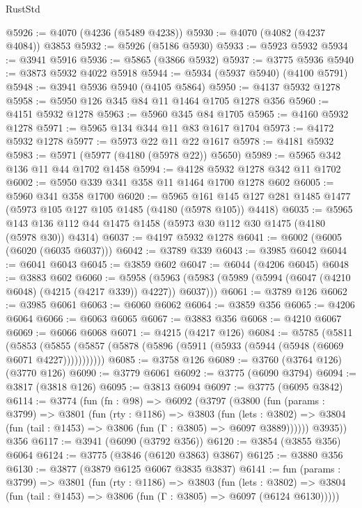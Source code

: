 \begin{lexlean}{RustStd}
\begin{coremodule}
{\begin{coremodule}
{{{{{{{{{{{{{{{{{{{{{{{{{{{{{{{@5926 := @4070 (@4236 (@5489 @4238))
@5930 := @4070 (@4082 (@4237 @4084)) @3853
@5932 := @5926 (@5186 @5930)
@5933 := @5923 @5932
@5934 := @3941 @5916
@5936 := @5865 (@3866 @5932)
@5937 := @3775 @5936
@5940 := @3873 @5932 @4022 @5918
@5944 := @5934 (@5937 @5940) (@4100 @5791)
@5948 := @3941 @5936 @5940 (@4105 @5864)
@5950 := @4137 @5932 @1278
@5958 := @5950 @126 @345 @84 @11 @1464 @1705 @1278 @356
@5960 := @4151 @5932 @1278
@5963 := @5960 @345 @84 @1705
@5965 := @4160 @5932 @1278
@5971 := @5965 @134 @344 @11 @83 @1617 @1704
@5973 := @4172 @5932 @1278
@5977 := @5973 @22 @11 @22 @1617
@5978 := @4181 @5932
@5983 := @5971 (@5977 (@4180 (@5978 @22)) @5650)
@5989 := @5965 @342 @136 @11 @44 @1702 @1458
@5994 := @4128 @5932 @1278 @342 @11 @1702
@6002 := @5950 @339 @341 @358 @11 @1464 @1700 @1278 @602
@6005 := @5960 @341 @358 @1700
@6020 := @5965
    @161
    @145
    @127
    @281
    @1485
    @1477
    (@5973 @105 @127 @105 @1485 (@4180 (@5978 @105)) @4418)
@6035 := @5965 @143 @136 @112 @44 @1475 @1458 (@5973 @30 @112 @30 @1475 (@4180 (@5978 @30)) @4314)
@6037 := @4197 @5932 @1278
@6041 := @6002 (@6005 (@6020 (@6035 @6037)))
@6042 := @3789 @339
@6043 := @3985 @6042
@6044 := @6041 @6043
@6045 := @3859 @602
@6047 := @6044 (@4206 @6045)
@6048 := @3883 @602
@6060 := @5958
    (@5963 (@5983 (@5989 (@5994 (@6047 (@4210 @6048) (@4215 (@4217 @339)) @4227)) @6037)))
@6061 := @3789 @126
@6062 := @3985 @6061
@6063 := @6060 @6062
@6064 := @3859 @356
@6065 := @4206 @6064
@6066 := @6063 @6065
@6067 := @3883 @356
@6068 := @4210 @6067
@6069 := @6066 @6068
@6071 := @4215 (@4217 @126)
@6084 := @5785
    (@5811
      (@5853 (@5855 (@5857 (@5878 (@5896 (@5911 (@5933 (@5944 (@5948 (@6069 @6071 @4227)))))))))))
@6085 := @3758 @126
@6089 := @3760 (@3764 @126) (@3770 @126)
@6090 := @3779 @6061
@6092 := @3775 (@6090 @3794)
@6094 := @3817 (@3818 @126)
@6095 := @3813 @6094
@6097 := @3775 (@6095 @3842)
@6114 := @3774
    (fun (fn : @98) =>
    @6092
      (@3797
        (@3800
          (fun (params : @3799) =>
          @3801
            (fun (rty : @1186) =>
            @3803
              (fun (lets : @3802) =>
              @3804 (fun (tail : @1453) => @3806 (fun (Γ : @3805) => @6097 @3889))))))
        @3935))
    @356
@6117 := @3941 (@6090 (@3792 @356))
@6120 := @3854 (@3855 @356) @6064
@6124 := @3775 (@3846 (@6120 @3863) @3867)
@6125 := @3880 @356
@6130 := @3877 (@3879 @6125 @6067 @3835 @3837)
@6141 := fun (params : @3799) =>
  @3801
    (fun (rty : @1186) =>
    @3803
      (fun (lets : @3802) =>
      @3804 (fun (tail : @1453) => @3806 (fun (Γ : @3805) => @6097 (@6124 @6130)))))
}}}}}}}}}}}}}}}}}}}}}}}}}}}}}}}
\end{coremodule}}
\end{coremodule}
\end{lexlean}
